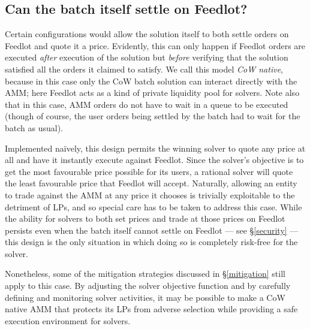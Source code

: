 \documentclass[a4paper,10pt]{article}
\theoremstyle{remark}
\begin{document}
\subsection{Can the batch itself settle on Feedlot?}
\label{solution-on-feedlot}

Certain configurations would allow the solution itself to both settle orders on Feedlot and quote it a price.
%
Evidently, this can only happen if Feedlot orders are executed \emph{after} execution of the solution but \emph{before} verifying that the solution satisfied all the orders it claimed to satisfy.
%
We call this model \emph{CoW native}, because in this case only the CoW batch solution can interact directly with the AMM; here Feedlot acts as a kind of private liquidity pool for solvers.
%
Note also that in this case, AMM orders do not have to wait in a queue to be executed (though of course, the user orders being settled by the batch had to wait for the batch as usual).

Implemented na\"ively, this design permits the winning solver to quote any price at all and have it instantly execute against Feedlot.
%
Since the solver's objective is to get the most favourable price possible for its users, a rational solver will quote the least favourable price that Feedlot will accept.
%
Naturally, allowing an entity to trade against the AMM at any price it chooses is trivially exploitable to the detriment of LPs, and so special care has to be taken to address this case.
%
While the ability for solvers to both set prices and trade at those prices on Feedlot persists even when the batch  itself cannot settle on Feedlot --- see \S\ref{security} --- this design is the only situation in which doing so is completely risk-free for the solver.

Nonetheless, some of the mitigation strategies discussed in \S\ref{mitigation} still apply to this case.
%
By adjusting the solver objective function and by carefully defining and monitoring solver activities, it may be possible to make a CoW native AMM that protects its LPs from adverse selection while providing a safe execution environment for solvers.
\end{document}
